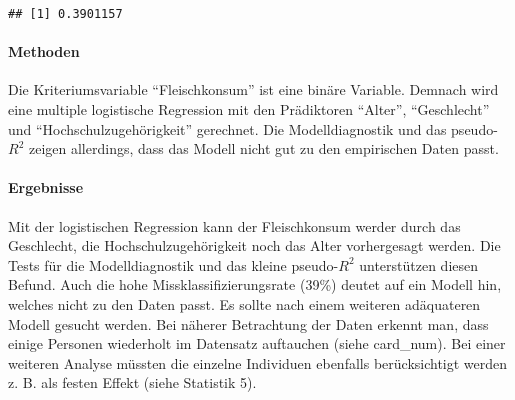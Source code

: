 \documentclass[]{article}
\let\oldparagraph\paragraph
\renewcommand{\paragraph}[1]{\oldparagraph{#1}\mbox{}}
\begin{document}
\begin{verbatim}
## [1] 0.3901157
\end{verbatim}

\paragraph{Methoden}\label{methoden}

Die Kriteriumsvariable ``Fleischkonsum'' ist eine binäre Variable.
Demnach wird eine multiple logistische Regression mit den Prädiktoren
``Alter'', ``Geschlecht'' und ``Hochschulzugehörigkeit'' gerechnet. Die
Modelldiagnostik und das pseudo-\(R^2\) zeigen allerdings, dass das
Modell nicht gut zu den empirischen Daten passt.

\paragraph{Ergebnisse}\label{ergebnisse}

Mit der logistischen Regression kann der Fleischkonsum werder durch das
Geschlecht, die Hochschulzugehörigkeit noch das Alter vorhergesagt
werden. Die Tests für die Modelldiagnostik und das kleine pseudo-\(R^2\)
unterstützen diesen Befund. Auch die hohe Missklassifizierungsrate
(39\%) deutet auf ein Modell hin, welches nicht zu den Daten passt. Es
sollte nach einem weiteren adäquateren Modell gesucht werden. Bei
näherer Betrachtung der Daten erkennt man, dass einige Personen
wiederholt im Datensatz auftauchen (siehe card\_num). Bei einer weiteren
Analyse müssten die einzelne Individuen ebenfalls berücksichtigt werden
z. B. als festen Effekt (siehe Statistik 5).
\end{document}

